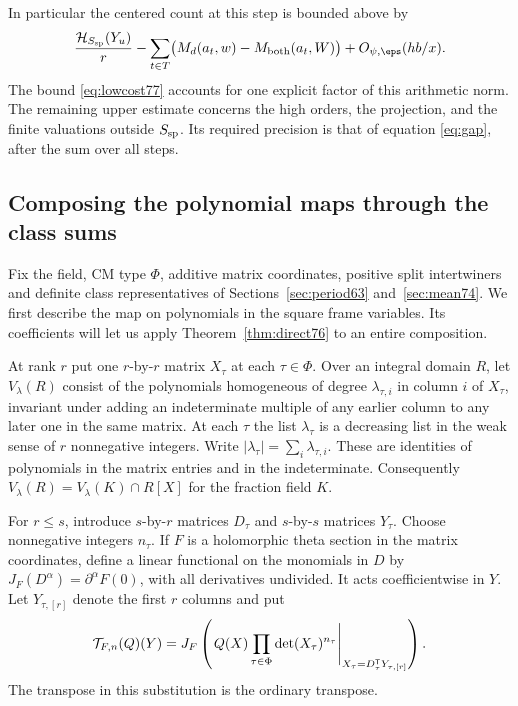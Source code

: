 \documentclass[a4paper,11pt]{article}
\theoremstyle{definition}
\theoremstyle{remark}
\numberwithin{equation}{section}
\begin{document}
In particular the centered count at this step is bounded above by
\[
 \frac{\mathcal H_{S_{\rm sp}}(Y_u)}r-
 \sum_{t\in T}\bigl(M_d(a_t,w)-M_{\rm both}(a_t,W)\bigr)
       +O_{\psi,\eps}(hb/x).
\]
The bound \eqref{eq:lowcost77} accounts for one explicit factor
of this arithmetic norm. The remaining upper estimate concerns
the high orders, the projection, and the finite valuations outside
\(S_{\rm sp}\). Its required precision is that of equation \ref{eq:gap}, after the sum over all steps.

\subsection{Composing the polynomial maps through the class sums}\label{nav:VI-02}
\label{sec:chain81}

Fix the field, CM type \(\Phi\), additive matrix coordinates, positive
split intertwiners and definite class representatives of
Sections~\ref{sec:period63} and~\ref{sec:mean74}. We first describe
the map on polynomials in the square frame variables. Its coefficients
will let us apply Theorem~\ref{thm:direct76} to an entire composition.

At rank \(r\) put one \(r\)-by-\(r\) matrix \(X_\tau\) at each
\(\tau\in\Phi\). Over an integral domain \(R\), let \(V_\lambda(R)\)
consist of the polynomials homogeneous of degree \(\lambda_{\tau,i}\)
in column \(i\) of \(X_\tau\), invariant under adding an indeterminate
multiple of any earlier column to any later one in the same matrix.
At each \(\tau\) the list \(\lambda_\tau\) is a decreasing list in the
weak sense of \(r\) nonnegative integers. Write
\(|\lambda_\tau|=\sum_i\lambda_{\tau,i}\). These are identities of
polynomials in the matrix entries and in the indeterminate.
Consequently \(V_\lambda(R)=V_\lambda(K)\cap R[X]\) for the
fraction field \(K\).

For \(r\le s\), introduce \(s\)-by-\(r\) matrices \(D_\tau\) and
\(s\)-by-\(s\) matrices \(Y_\tau\). Choose nonnegative integers
\(n_\tau\). If \(F\) is a holomorphic theta section in the matrix
coordinates, define a linear functional on the monomials in \(D\) by
\(J_F(D^\alpha)=\partial^\alpha F(0)\), with all derivatives
undivided. It acts coefficientwise in \(Y\). Let \(Y_{\tau,[r]}\)
denote the first \(r\) columns and put
\begin{equation}
 {\cal T}_{F,n}(Q)(Y)=J_F\left(
   \left.Q(X)\prod_{\tau\in\Phi}\det(X_\tau)^{n_\tau}
             \right|_{X_\tau=D_\tau^{\mathsf T}Y_{\tau,[r]}}\right).
 \label{eq:sub81}
\end{equation}
The transpose in this substitution is the ordinary transpose.
\end{document}

